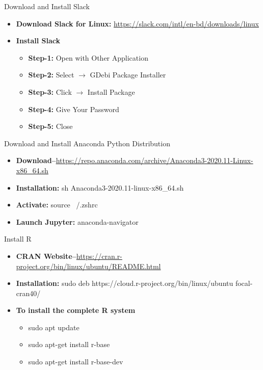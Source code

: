 \begin{frame}[t]{Download and Install Slack}
	\begin{itemize}
		\item \textbf{Download Slack for Linux:} 
		\url{https://slack.com/intl/en-bd/downloads/linux}
		\item \textbf{Install Slack} 
			\begin{itemize}
			\item \textbf{Step-1:}  Open with Other Application 
			\item \textbf{Step-2:}  Select $\rightarrow$ GDebi Package Installer
			\item \textbf{Step-3:}  Click $\rightarrow$ Install Package 
			\item \textbf{Step-4:}  Give Your Password 
			\item \textbf{Step-5:}  Close 
		\end{itemize}
	\end{itemize}
\end{frame}


\begin{frame}[t]{Download and Install Anaconda Python Distribution}
	\begin{itemize}
		\item 
		\textbf{Download--}\url{https://repo.anaconda.com/archive/Anaconda3-2020.11-Linux-x86_64.sh}
		\item \textbf{Installation:} sh Anaconda3-2020.11-linux-x86\_64.sh
		\item \textbf{Activate:} source ~/.zshrc
		\item \textbf{Launch Jupyter:} anaconda-navigator 
	\end{itemize}
\end{frame}

\begin{frame}[t]{Install R}
	\begin{itemize}
		\item 
		\textbf{CRAN 
		Website--}\url{https://cran.r-project.org/bin/linux/ubuntu/README.html}
		\item \textbf{Installation:} sudo deb 
		https://cloud.r-project.org/bin/linux/ubuntu focal-cran40/
		
		\item \textbf{To install the complete R system} 
		\begin{itemize}
			\item sudo apt update
			\item sudo apt-get install r-base
			\item sudo apt-get install r-base-dev
		\end{itemize}
	\end{itemize}
\end{frame}


